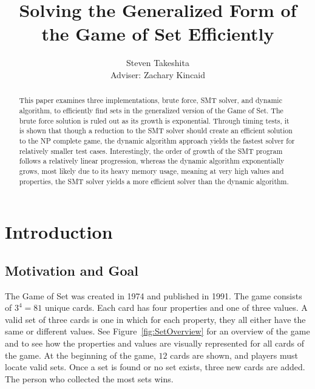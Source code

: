 \documentclass[pageno]{jpaper}
\begin{document}
\title{Solving the Generalized Form of the Game of Set Efficiently}

\author{Steven Takeshita\\Adviser: Zachary Kincaid}

\date{}
\maketitle

\thispagestyle{empty}
\doublespacing
\begin{abstract}
This paper examines three implementations, brute force, SMT solver, and dynamic algorithm, to efficiently find sets in the generalized version of the Game of Set. The brute force solution is ruled out as its growth is exponential. Through timing tests, it is shown that though a reduction to the SMT solver should create an efficient solution to the NP complete game, the dynamic algorithm approach yields the fastest solver for relatively smaller test cases. Interestingly, the order of growth of the SMT program follows a relatively linear progression, whereas the dynamic algorithm exponentially grows, most likely due to its heavy memory usage, meaning at very high values and properties, the SMT solver yields a more efficient solver than the dynamic algorithm. 
\end{abstract}

\section{Introduction}

\subsection{Motivation and Goal}

The Game of Set was created in 1974 and published in 1991. The game consists of $3^4 = 81$ unique cards. Each card has four properties and one of three values. A valid set of three cards is one in which for each property, they all either have the same or different values. See Figure~\ref{fig:SetOverview} for an overview of the game and to see how the properties and values are visually represented for all cards of the game. At the beginning of the game, $12$ cards are shown, and players must locate valid sets. Once a set is found or no set exists, three new cards are added. The person who collected the most sets wins. 
\end{document}
